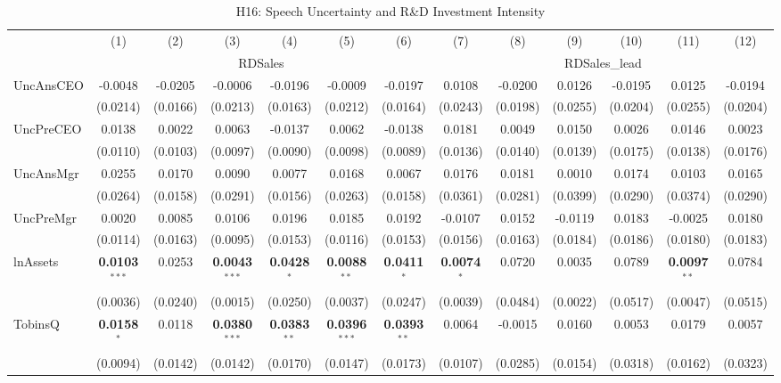 \documentclass[11pt,a4paper]{article}
\begin{document}
\begin{table}[htbp]
\centering
\caption{H16: Speech Uncertainty and R\&D Investment Intensity}
\label{tab:h16}
\scriptsize
\begin{tabular}{lcccccccccccc}
\toprule
 & (1) & (2) & (3) & (4) & (5) & (6) & (7) & (8) & (9) & (10) & (11) & (12) \\
 & \multicolumn{6}{c}{RDSales} & \multicolumn{6}{c}{RDSales\_lead} \\
\cmidrule(lr){2-7} \cmidrule(lr){8-13}
\midrule
UncAnsCEO & -0.0048 & -0.0205 & -0.0006 & -0.0196 & -0.0009 & -0.0197 & 0.0108 & -0.0200 & 0.0126 & -0.0195 & 0.0125 & -0.0194 \\
 & (0.0214) & (0.0166) & (0.0213) & (0.0163) & (0.0212) & (0.0164) & (0.0243) & (0.0198) & (0.0255) & (0.0204) & (0.0255) & (0.0204) \\
UncPreCEO & 0.0138 & 0.0022 & 0.0063 & -0.0137 & 0.0062 & -0.0138 & 0.0181 & 0.0049 & 0.0150 & 0.0026 & 0.0146 & 0.0023 \\
 & (0.0110) & (0.0103) & (0.0097) & (0.0090) & (0.0098) & (0.0089) & (0.0136) & (0.0140) & (0.0139) & (0.0175) & (0.0138) & (0.0176) \\
UncAnsMgr & 0.0255 & 0.0170 & 0.0090 & 0.0077 & 0.0168 & 0.0067 & 0.0176 & 0.0181 & 0.0010 & 0.0174 & 0.0103 & 0.0165 \\
 & (0.0264) & (0.0158) & (0.0291) & (0.0156) & (0.0263) & (0.0158) & (0.0361) & (0.0281) & (0.0399) & (0.0290) & (0.0374) & (0.0290) \\
UncPreMgr & 0.0020 & 0.0085 & 0.0106 & 0.0196 & 0.0185 & 0.0192 & -0.0107 & 0.0152 & -0.0119 & 0.0183 & -0.0025 & 0.0180 \\
 & (0.0114) & (0.0163) & (0.0095) & (0.0153) & (0.0116) & (0.0153) & (0.0156) & (0.0163) & (0.0184) & (0.0186) & (0.0180) & (0.0183) \\
\midrule
lnAssets & \textbf{0.0103}$^{***}$ & 0.0253 & \textbf{0.0043}$^{***}$ & \textbf{0.0428}$^{*}$ & \textbf{0.0088}$^{**}$ & \textbf{0.0411}$^{*}$ & \textbf{0.0074}$^{*}$ & 0.0720 & 0.0035 & 0.0789 & \textbf{0.0097}$^{**}$ & 0.0784 \\
 & (0.0036) & (0.0240) & (0.0015) & (0.0250) & (0.0037) & (0.0247) & (0.0039) & (0.0484) & (0.0022) & (0.0517) & (0.0047) & (0.0515) \\
TobinsQ & \textbf{0.0158}$^{*}$ & 0.0118 & \textbf{0.0380}$^{***}$ & \textbf{0.0383}$^{**}$ & \textbf{0.0396}$^{***}$ & \textbf{0.0393}$^{**}$ & 0.0064 & -0.0015 & 0.0160 & 0.0053 & 0.0179 & 0.0057 \\
 & (0.0094) & (0.0142) & (0.0142) & (0.0170) & (0.0147) & (0.0173) & (0.0107) & (0.0285) & (0.0154) & (0.0318) & (0.0162) & (0.0323) \\

\end{tabular}
\end{table}
\end{document}

